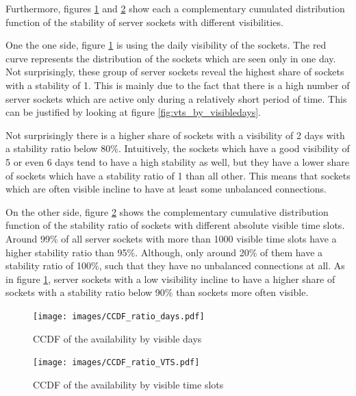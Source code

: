 Furthermore, figures \ref{fig:ccdf_ratio_days} and \ref{fig:ccdf_ratio_vts} show 
each a complementary cumulated distribution function of the stability of server 
sockets with different visibilities. 

One the one side, figure \ref{fig:ccdf_ratio_days} is using the daily visibility 
of the sockets. The red curve represents the distribution of the sockets which 
are seen only in one day. Not surprisingly, these group of \glspl{server socket} 
reveal the highest share of sockets with a stability of 1. This is mainly due to 
the fact that there is a high number of \glspl{server socket} which are active 
only during a relatively short period of time. This can be justified by looking 
at figure \ref{fig:vts_by_visibledays}.

Not surprisingly there is a higher share of sockets with a visibility of 2 days 
with a stability ratio below 80\%. Intuitively, the sockets which have a good 
visibility of 5 or even 6 days tend to have a high stability as well, but they 
have a lower share of sockets which have a stability ratio of 1 than all other. 
This means that sockets which are often visible incline to have at least some 
unbalanced connections. 

On the other side, figure \ref{fig:ccdf_ratio_vts} shows the complementary 
cumulative distribution function of the stability ratio of sockets with 
different absolute visible time slots. Around 99\% of all \glspl{server socket} 
with more than 1000 visible time slots have a higher stability ratio than 95\%. 
Although, only around 20\% of them have a stability ratio of 100\%, such that 
they have no unbalanced connections at all.
As in figure \ref{fig:ccdf_ratio_days}, \glspl{server socket} with a low 
visibility incline to have a higher share of sockets with a stability ratio 
below 90\% than sockets more often visible. 

\begin{landscape}
\begin{figure}
	[p] \centering 
	\texttt{[image: images/CCDF\_ratio\_days.pdf]}
	\caption{CCDF of the availability by visible days} 
	\label{fig:ccdf_ratio_days} 
\end{figure}
\end{landscape}

\begin{landscape}
\begin{figure}
	[p] \centering 
	\texttt{[image: images/CCDF\_ratio\_VTS.pdf]}
	\caption{CCDF of the availability by visible time slots} 
	\label{fig:ccdf_ratio_vts} 
\end{figure}
\end{landscape}

